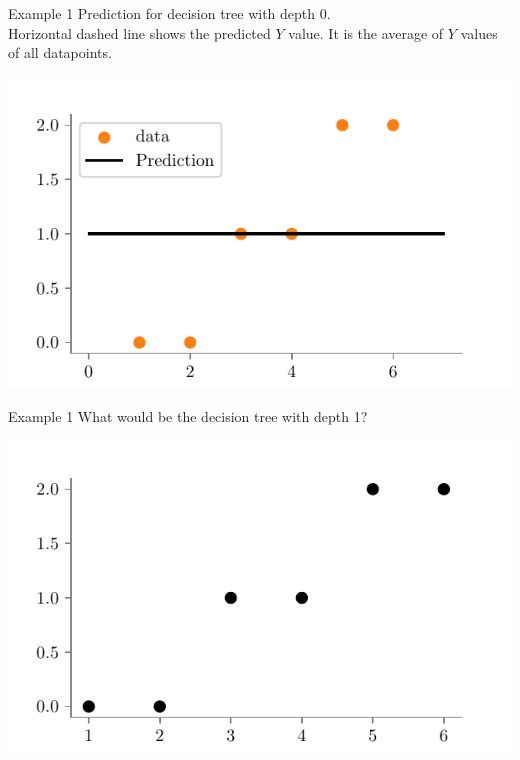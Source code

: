 \documentclass{beamer}
\begin{document}
\begin{frame}{Example 1}
Prediction for decision tree with depth 0.\\
Horizontal dashed line shows the predicted $Y$ value. It is the average of $Y$ values of all datapoints.\\
\begin{center}
\includegraphics{../figures/decision-trees/ri-ro-depth-0.pdf}	
\end{center}
\end{frame}


\begin{frame}{Example 1}
What would be the decision tree with depth 1?
\begin{center}
\includegraphics{../figures/decision-trees/ri-ro-dataset.pdf}
\end{center}
\end{frame}
\end{document}
